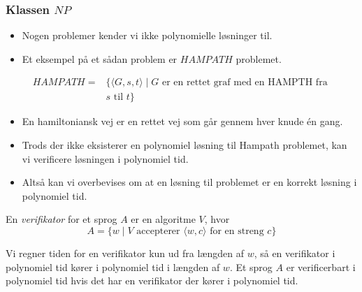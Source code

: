 \begin{frame}[allowframebreaks]
  \frametitle{Klassen $NP$}
 \begin{itemize}
   \item Nogen problemer kender vi ikke polynomielle løsninger til.
   \item Et eksempel på et sådan problem er $HAMPATH$ problemet.
 \end{itemize}

 \begin{align*}
   HAMPATH = &\{\langle G, s, t \rangle \mid G \text{ er en rettet graf med en HAMPTH fra } \\
   &s \text{ til } t\}
 \end{align*}

 \begin{itemize}
   \item En hamiltoniansk vej er en rettet vej som går gennem hver knude én gang.
   \item Trods der ikke eksisterer en polynomiel løsning til Hampath problemet, kan vi verificere løsningen i polynomiel tid.
   \item Altså kan vi overbevises om at en løsning til problemet er en korrekt løsning i polynomiel tid.
 \end{itemize}

 \begin{definition}
   En \textit{verifikator} for et sprog $A$ er en algoritme $V$, hvor
   \begin{equation*}
     A = \{w \mid V \text{ accepterer } \langle w, c \rangle \text{ for en streng }c\}
   \end{equation*}

   Vi regner tiden for en verifikator kun ud fra længden af $w$, så en verifikator i polynomiel tid kører i polynomiel tid i længden af $w$. Et sprog $A$ er verificerbart i polynomiel tid hvis det har en verifikator der kører i polynomiel tid.
 \end{definition}


\end{frame}
